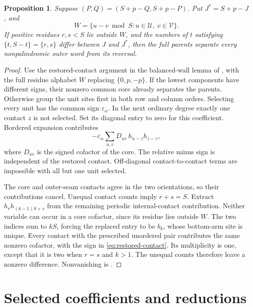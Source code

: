 \documentclass[11pt,a4paper]{amsart}
\numberwithin{equation}{section}
\theoremstyle{plain}
\newtheorem{proposition}[theorem]{Proposition}
\theoremstyle{definition}
\begin{document}
\begin{proposition}\label{prop:contact-orientation}
Suppose \((P,Q)=(S+p-Q,S+p-P)\).  Put \(J^*=S+p-J\), and
\[
 W=\{u-v\bmod S:u\in\mathcal U,\ v\in\mathcal V\}.
\]
If positive residues \(r,s<S\) lie outside \(W\), and the numbers of \(t\) satisfying \(\{t,S-t\}=\{r,s\}\) differ between \(J\) and \(J^*\), then the full parents separate every nonpalindromic outer word from its reversal.
\end{proposition}
\begin{proof}
Use the restored-contact argument in the balanced-wall lemma of \cite{Shields2026PowerRigidity}, with the full residue alphabet \(W\) replacing \(\{0,p,-p\}\).  If the lowest components have different signs, their nonzero common core already separates the parents.  Otherwise group the unit sites first in both row and column orders.  Selecting every unit has the common sign \(\varepsilon_\alpha\).  In the next ordinary degree exactly one contact \(z\) is not selected.  Set its diagonal entry to zero for this coefficient.  Bordered expansion contributes
\begin{equation}\label{eq:restored-contact}
 -\varepsilon_\alpha\sum_{u,v}D_{uv}\,h_{u-z}h_{z-v},
\end{equation}
where \(D_{uv}\) is the signed cofactor of the core.  The relative minus sign is independent of the restored contact.  Off-diagonal contact-to-contact terms are impossible with all but one unit selected.

The core and outer-seam contacts agree in the two orientations, so their contributions cancel.  Unequal contact counts imply \(r+s=S\).  Extract \(h_rh_{(k-1)S+s}\) from the remaining periodic internal-contact contribution.  Neither variable can occur in a core cofactor, since its residue lies outside \(W\).  The two indices sum to \(kS\), forcing the replaced entry to be \(b_k\), whose bottom-arm site is unique.  Every contact with the prescribed unordered pair contributes the same nonzero cofactor, with the sign in \eqref{eq:restored-contact}.  Its multiplicity is one, except that it is two when \(r=s\) and \(k>1\).  The unequal counts therefore leave a nonzero difference.  Nonvanishing is .
\end{proof}

\section{Selected coefficients and reductions}\label{sec:reductions}
\end{document}
